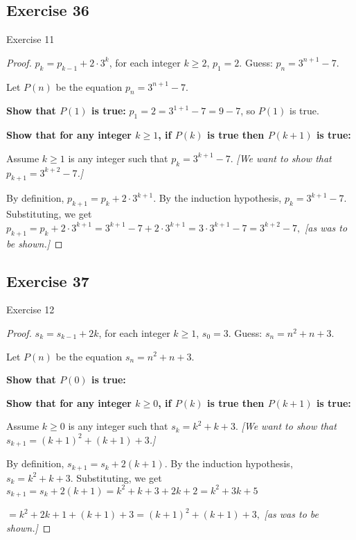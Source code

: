 \documentclass[14pt]{extarticle}
\newcommand{\dps}{\displaystyle}
\begin{document}
\subsection{Exercise 36}
Exercise 11

\begin{proof}
    \(p_k = p_{k-1} + 2 \cdot 3^k\), for each integer \(k \geq 2\), \(p_1 = 2\). Guess: \(\dps p_n = 3^{n+1} - 7\).

    Let $P(n)$ be the equation \(p_n = 3^{n+1} - 7\).

        {\bf Show that \(P(1)\) is true:} \(p_1 = 2 = 3^{1+1} - 7 = 9-7\), so $P(1)$ is true.

        {\bf Show that for any integer \(k \geq 1\), if \(P(k)\) is true then \(P(k+1)\) is true:}

    Assume \(k \geq 1\) is any integer such that \(p_k = 3^{k+1} - 7\).
        {\it [We want to show that \(\dps p_{k+1} = 3^{k+2} - 7\).]}

    By definition, \(p_{k+1} = p_k + 2 \cdot 3^{k+1}\).
    By the induction hypothesis, \(p_k = 3^{k+1} - 7\).
    Substituting, we get
    \(
    p_{k+1} = p_k + 2 \cdot 3^{k+1} = 3^{k+1} - 7 + 2 \cdot 3^{k+1} = 3 \cdot 3^{k+1} - 7 = 3^{k+2} - 7,
    \)
    {\it [as was to be shown.]}
\end{proof}

\subsection{Exercise 37}
Exercise 12

\begin{proof}
    \(s_k = s_{k-1} + 2k\), for each integer \(k \geq 1\), \(s_0 = 3\). Guess: \(s_n = n^2 + n + 3\).

    Let $P(n)$ be the equation \(s_n = n^2 + n + 3\).

        {\bf Show that \(P(0)\) is true:}

        {\bf Show that for any integer \(k \geq 0\), if \(P(k)\) is true then \(P(k+1)\) is true:}

    Assume \(k \geq 0\) is any integer such that \(s_k = k^2 + k + 3\).
        {\it [We want to show that \(s_{k+1} = (k+1)^2 + (k+1) + 3\).]}

    By definition, \(s_{k+1} = s_k + 2(k+1)\).
    By the induction hypothesis, \(s_k = k^2 + k + 3\).
    Substituting, we get \(s_{k+1} = s_k + 2(k+1) = k^2 + k + 3 + 2k + 2 = k^2 + 3k + 5\)

    \(= k^2 + 2k + 1 + (k+1) + 3 = (k+1)^2 + (k+1) + 3,\)
    {\it [as was to be shown.]}
\end{proof}
\end{document}
